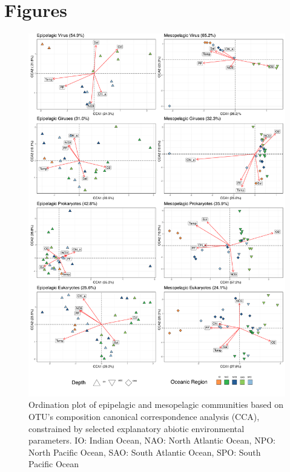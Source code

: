 \documentclass[fleqn,10pt]{wlscirep}
\begin{document}
\newpage
\section*{Figures}

\begin{figure}[ht]
    \centering
    \includegraphics[scale=0.285]{images/custom_cca_plot_hellinger_no_bathy_labels_OS_regions_colors_to_print.pdf}
    \caption{Ordination plot of epipelagic and mesopelagic communities based on OTU’s composition canonical correspondence analysis (CCA), constrained by selected explanatory abiotic environmental parameters. IO: Indian Ocean, NAO: North Atlantic Ocean, NPO: North Pacific Ocean, SAO: South Atlantic Ocean, SPO: South Pacific Ocean}
    \label{fig:cca_OS}
\end{figure}
\clearpage
\end{document}
